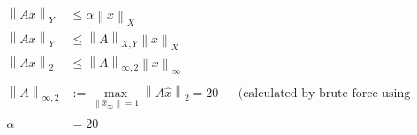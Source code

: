 \documentclass[12pt,fleqn,leqno,letterpaper]{article}
\newcommand{\norm}[1]{\left\lVert#1\right\rVert}
\begin{document}
\begin{enumerate}
\begin{align*}
                \norm{Ax}_{Y} &\le \alpha \norm{x}_{X}\\
                \norm{Ax}_{Y} &\le \norm{A}_{X,Y} \norm{x}_{X}\\
                \norm{Ax}_{2} &\le \norm{A}_{\infty, 2} \norm{x}_{\infty}\\\\
                \norm{A}_{\infty, 2} &:= \max_{\norm{\hat{x}_{\infty}} = 1} \norm{A\hat{x}}_{2} = 20 && \text{(calculated by brute force using MATLAB)}\\\\
                \alpha &= 20\\
            \end{align*}
	\end{enumerate}
\end{document}
